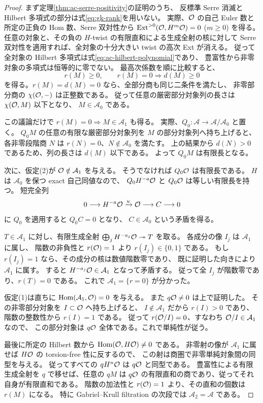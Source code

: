 \begin{proof}
まず定理\ref{thm:ac-serre-positivity}の証明のうち、
反標準 Serre 消滅と Hilbert 多項式の部分は式\eqref{eq:gk-rank}を用いない。
実際、$\mathcal O$ の自己 Euler 数と所定の正負の Hom 数、Serre 双対性から
$\operatorname{Ext}^{>0}(\mathcal O,H^m\mathcal O)=0$ ($m\ge0$) を得る。
任意の対象と、その負の $H$-twist の有限直和による生成全射の核に対して
Serre 双対性を適用すれば、全対象の十分大きい twist の高次 Ext が消える。
従って全対象の Hilbert 多項式は式\eqref{eq:ac-hilbert-polynomial}であり、
豊富性から非零対象の多項式は恒等的に零でない。
最高次係数を順に比較すると、
\[
 r(M)\ge0,\qquad r(M)=0\Rightarrow d(M)\ge0
\]
を得る。$r(M)=d(M)=0$ なら、全部分商も同じ二条件を満たし、
非零部分商の $\chi(\mathcal O,-)$ は正整数である。
従って任意の厳密部分対象列の長さは $\chi(\mathcal O,M)$ 以下となり、
$M\in\mathcal A_0$ である。

この議論だけで $r(M)=0\Rightarrow M\in\mathcal A_1$ も得る。
実際、$Q_0:\mathcal A\to\mathcal A/\mathcal A_0$ と置く。
$Q_0M$ の任意の有限な厳密部分対象列を $M$ の部分対象列へ持ち上げると、
各非零段階商 $N$ は $r(N)=0$、$N\notin\mathcal A_0$ を満たす。
上の結果から $d(N)>0$ であるため、列の長さは $d(M)$ 以下である。
よって $Q_0M$ は有限長となる。

次に、仮定(2)が $\mathcal O\notin\mathcal A_1$ を与える。
そうでなければ $Q_0\mathcal O$ は有限長である。
$H$ は $\mathcal A_0$ を保つ exact 自己同値なので、
$Q_0H^{-a}\mathcal O$ と $Q_0\mathcal O$ は等しい有限長を持つ。
短完全列
\[
 0\longrightarrow H^{-a}\mathcal O\xrightarrow{u}\mathcal O
 \longrightarrow C\longrightarrow0
\]
に $Q_0$ を適用すると $Q_0C=0$ となり、
$C\in\mathcal A_0$ という矛盾を得る。

$T\in\mathcal A_1$ に対し、有限生成全射
$\bigoplus_jH^{-a_j}\mathcal O\twoheadrightarrow T$ を取る。
各成分の像 $I_j$ は $\mathcal A_1$ に属し、
階数の非負性と $r(\mathcal O)=1$ より $r(I_j)\in\{0,1\}$ である。
もし $r(I_j)=1$ なら、その成分の核は数値階数零であり、
既に証明した向きにより $\mathcal A_1$ に属す。
すると $H^{-a_j}\mathcal O\in\mathcal A_1$ となって矛盾する。
従って全 $I_j$ が階数零であり、$r(T)=0$ である。
これで $\mathcal A_1=\{r=0\}$ が分かった。

仮定(1)は直ちに $\operatorname{Hom}(\mathcal A_1,\mathcal O)=0$ を与える。
また $q\mathcal O\ne0$ は上で証明した。
その非零部分対象を $I\subset\mathcal O$ へ持ち上げると、
$I\notin\mathcal A_1$ だから $r(I)>0$ であり、
階数の整数性から $r(I)=1$ である。
従って $r(\mathcal O/I)=0$、すなわち $\mathcal O/I\in\mathcal A_1$ なので、
この部分対象は $q\mathcal O$ 全体である。これで単純性が従う。

最後に所定の Hilbert 数から $\operatorname{Hom}(\mathcal O,H\mathcal O)\ne0$ である。
非零射の像が $\mathcal A_1$ に属せば $H\mathcal O$ の torsion-free 性に反するので、
この射は商圏で非零単純対象間の同型を与える。
従ってすべての $qH^n\mathcal O$ は $q\mathcal O$ と同型である。
豊富性による有限生成全射を $q$ で移せば、任意の $qM$ は
$q\mathcal O$ の有限直和の商であり、従ってそれ自身が有限直和である。
階数の加法性と $r(\mathcal O)=1$ より、その直和の個数は $r(M)$ になる。
特に Gabriel--Krull filtration の次段では $\mathcal A_2=\mathcal A$ である。
\end{proof}

